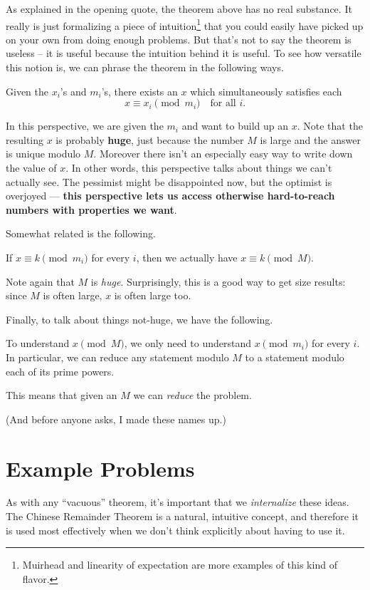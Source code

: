 \documentclass[11pt]{scrartcl}
\begin{document}
As explained in the opening quote, the theorem above has no real substance.
It really is just formalizing a piece of intuition\footnote{Muirhead
  and linearity of expectation are more examples of this kind of flavor.}
that you could easily have picked up on your own from doing enough problems.
But that's not to say the theorem is useless -- it is useful because the intuition behind it is useful.
To see how versatile this notion is, we can phrase the theorem in the following ways.

\begin{CRT}[Construction]
  Given the $x_i$'s and $m_i$'s,
  there exists an $x$ which simultaneously satisfies each
  \[ x \equiv x_i \pmod{m_i} \quad \text{for all $i$.} \]
\end{CRT}
In this perspective, we are given the $m_i$ and want to build up an $x$.
Note that the resulting $x$ is probably \textbf{huge},
just because the number $M$ is large and the answer is unique modulo $M$.
Moreover there isn't an especially easy way to write down the value of $x$.
In other words, this perspective talks about things we can't actually see.
The pessimist might be disappointed now, but the optimist is overjoyed ---
\textbf{this perspective lets us access otherwise hard-to-reach numbers with properties we want}.

Somewhat related is the following.
\begin{CRT}[Lifting]
  If $x \equiv k \pmod{m_i}$ for every $i$,
  then we actually have $x \equiv k \pmod{M}$.
\end{CRT}
Note again that $M$ is \emph{huge}.
Surprisingly, this is a good way to get size results:
since $M$ is often large, $x$ is often large too.

Finally, to talk about things not-huge, we have the following.
\begin{CRT}[Destruction]
  To understand $x \pmod M$, we only need to understand $x \pmod{m_i}$ for every $i$.
  In particular, we can reduce any statement modulo $M$ to a statement
  modulo each of its prime powers.
\end{CRT}
This means that given an $M$ we can \emph{reduce} the problem.

(And before anyone asks, I made these names up.)

\section{Example Problems}
As with any ``vacuous'' theorem, it's important that we \emph{internalize} these ideas.
The Chinese Remainder Theorem is a natural, intuitive concept,
and therefore it is used most effectively when we don't think explicitly about having to use it.
\end{document}
